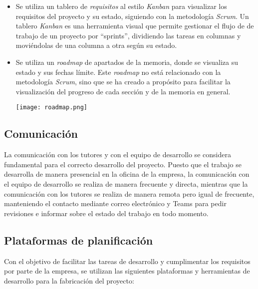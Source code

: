 \begin{itemize}
	\item Se utiliza un tablero de \textit{requisitos} al estilo \textit{Kanban} para visualizar
		los requisitos del proyecto y su estado, siguiendo con la metodología \textit{Scrum}.
		Un tablero \textit{Kanban} es una herramienta visual que permite gestionar el flujo de
		de trabajo de un proyecto por ``sprints'', dividiendo las tareas en columnas y moviéndolas
		de una columna a otra según su estado.
	\item Se utiliza un \textit{roadmap} de apartados de la memoria, donde se visualiza su estado
		y sus fechas límite. Este \textit{roadmap} no está relacionado con la metodología
		\textit{Scrum}, sino que se ha creado a propósito para facilitar la visualización del
		progreso de cada sección y de la memoria en general.

		\begin{minipage}{\linewidth}
			\centering
			\texttt{[image: roadmap.png]}
		\end{minipage}
\end{itemize}


\subsection{Comunicación}\label{subsec:comunicación}
La comunicación con los tutores y con el equipo de desarrollo se considera fundamental para el
correcto desarrollo del proyecto. Puesto que el trabajo se desarrolla de manera presencial en
la oficina de la empresa, la comunicación con el equipo de desarrollo se realiza de manera
frecuente y directa, mientras que la comunicación con los tutores se realiza de manera remota
pero igual de frecuente, manteniendo el contacto mediante correo electrónico y Teams para
pedir revisiones e informar sobre el estado del trabajo en todo momento.

\subsection{Plataformas de planificación}\label{subsec:plataformas}
Con el objetivo de facilitar las tareas de desarrollo y cumplimentar los requisitos por parte
de la empresa, se utilizan las siguientes plataformas y herramientas de desarrollo para la
fabricación del proyecto:

